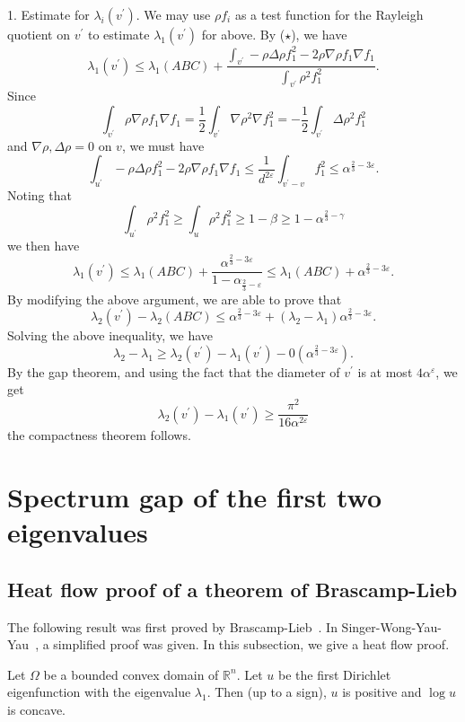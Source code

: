 1. Estimate for $ \lambda _i (v ^\prime) $. We may use $ \rho f_i $ as a test function for the Rayleigh quotient on $ v ^\prime $ to estimate $ \lambda _1 (v^\prime) $ for above. By ($\star$), we have 
%
\[\lambda_1 (v ^\prime) \leq \lambda _1 (ABC) + \frac{\int_{v^{\prime}} - \rho \Delta \rho f _1^2 - 2 \rho \nabla \rho f _1 \nabla f_1}{\int _{v^{\prime}} \rho ^2 f ^2_1} .\]
%
Since 
%
\[ \int _{v^{\prime}} \rho \nabla \rho f _1 \nabla f_1 = \frac{1}{2} \int _{v^{\prime}} \nabla \rho^2 \nabla f_1^2 = - \frac{1}{2} \int _{v^{\prime}} \Delta \rho^2   f_1^2\]
%
and $ \nabla \rho, \Delta \rho = 0 $ on $ v $, we must have 
%
\[ \int _{u^{\prime}} -\rho \Delta \rho f _1^2 - 2  \rho\nabla \rho f_1  \nabla f _1 \leq  \frac{1}{d^{2 \varepsilon}} \int _{v^{\prime} - v}   f _1^2 \leq  \alpha ^{\frac{2}{3} - 3 \varepsilon}.\]
%
Noting that 
%
\[\int _{u^{\prime}}  \rho ^2 f ^2_1 \geq \int_u \rho^2 f ^2_1 \geq 1 - \beta \geq 1 - \alpha ^{\frac{2}{3} - \gamma}\]
%
we then have
\[ \lambda _1 (v^\prime) \leq \lambda _1 (ABC) + \frac{\alpha ^{\frac{2}{3} - 3 \varepsilon}}{1 - \alpha _{\frac{2}{3} - \varepsilon}} \leq \lambda _1 (ABC) + \alpha ^{ \frac{2}{3} -  3 \varepsilon}. \]
%
By modifying the above argument, we are able to prove that 
%
\[ \lambda _2 (v ^\prime) - \lambda _2 (ABC) \leq \alpha ^{ \frac{2}{3} -  3 \varepsilon}  + ( \lambda _2 - \lambda _1) \alpha ^{ \frac{2}{3} -  3 \varepsilon}.  \]
%
Solving the above inequality, we have 
%
\[ \lambda _2 - \lambda _1 \geq \lambda _2 (v ^\prime) - \lambda _1 ( v ^\prime) - 0 (\alpha ^{ \frac{2}{3} -  3 \varepsilon} ).\]
%
By the gap theorem, and using the fact that the diameter of $ v ^\prime $ is at most $ 4 \alpha ^\varepsilon $, we get 
%
\[ \lambda _2  (v ^\prime) - \lambda _1 ( v ^\prime)  \geq \frac{\pi^2}{16 \alpha ^{2 \varepsilon}}\]
the compactness theorem follows.

\section{Spectrum gap of the first two eigenvalues}

\subsection{Heat flow proof of a theorem of Brascamp-Lieb}
The following result was first proved by Brascamp-Lieb~\cite{blieb}. In Singer-Wong-Yau-Yau~\cite{swyy}, a simplified proof was given.
In this subsection, we give a heat flow proof.

\begin{theorem}
Let $\Omega$ be a bounded convex domain of $\mathbb{R}^n$. Let $u$ be the first
Dirichlet eigenfunction with the eigenvalue $\lambda_1$. Then (up to a sign),
$u$ is positive and $\log u$ is concave.
\end{theorem}

